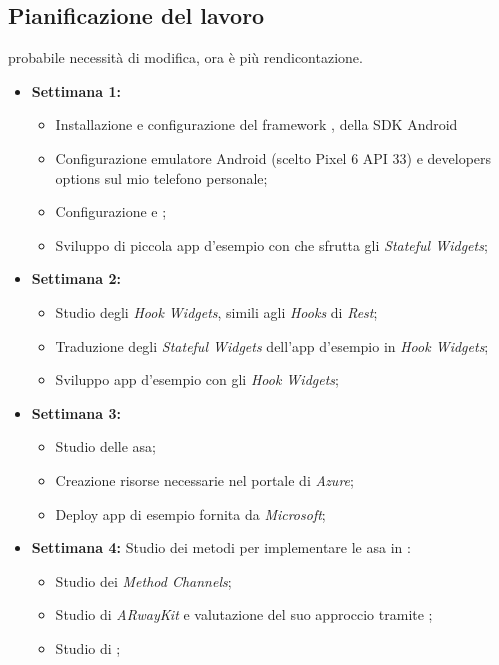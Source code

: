 \subsection{Pianificazione del lavoro}
\todo probabile necessità di modifica, ora è più rendicontazione.
\begin{itemize}
    \item \textbf{Settimana 1:} 
        \begin{itemize}
            \item Installazione e configurazione del framework \flutter, della SDK Android 
            \item Configurazione emulatore Android (scelto Pixel 6 API 33) e 
            developers options sul mio telefono personale;
            \item Configurazione \vsc e \astudio;
            \item Sviluppo di piccola app d'esempio con \flutter che sfrutta gli \textit{Stateful Widgets};
        \end{itemize} 
    \item \textbf{Settimana 2:} 
        \begin{itemize}
            \item Studio degli \textit{Hook Widgets}, simili agli \textit{Hooks} di \textit{Rest};
            \item Traduzione degli \textit{Stateful Widgets} dell'app d'esempio in \textit{Hook Widgets};
            \item Sviluppo app d'esempio con gli \textit{Hook Widgets};
        \end{itemize}
    \item \textbf{Settimana 3:} 
        \begin{itemize}
            \item Studio delle asa;
            \item Creazione risorse necessarie nel portale di \textit{Azure};
            \item Deploy app di esempio fornita da \textit{Microsoft};
        \end{itemize}
    \item \textbf{Settimana 4:} Studio dei metodi per implementare le asa in \flutter:
        \begin{itemize}
            \item Studio dei \textit{Method Channels};
            \item Studio di \textit{ARwayKit} e valutazione del suo approccio tramite \unity;
            \item Studio di \arplug;

\end{itemize}
\end{itemize}
